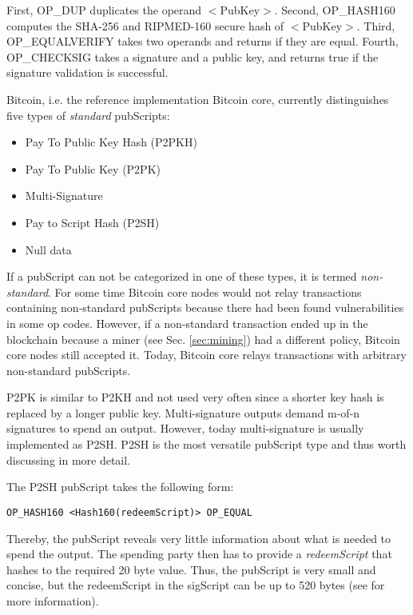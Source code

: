 First, OP\_DUP duplicates the operand $<$PubKey$>$. Second, OP\_HASH160 computes the SHA-256 and RIPMED-160 secure hash of $<$PubKey$>$. Third, OP\_EQUALVERIFY takes two operands and returns if they are equal. Fourth, OP\_CHECKSIG takes a signature and a public key, and returns true if the signature validation is successful. 

Bitcoin, i.e. the reference implementation Bitcoin core, currently distinguishes five types of \emph{standard} pubScripts:

\begin{itemize}
\item Pay To Public Key Hash (P2PKH)
\item Pay To Public Key (P2PK)
\item Multi-Signature 
\item Pay to Script Hash (P2SH)
\item Null data
\end{itemize}

If a pubScript can not be categorized in one of these types, it is termed \emph{non-standard}. For some time Bitcoin core nodes would not relay transactions containing non-standard pubScripts because there had been found vulnerabilities in some op codes. However, if a non-standard transaction ended up in the blockchain because a miner  (see Sec. \ref{sec:mining}) had a different policy, Bitcoin core nodes still accepted it. Today, Bitcoin core relays transactions with arbitrary non-standard pubScripts.

P2PK is similar to P2KH and not used very often since a shorter key hash is replaced by a longer public key. Multi-signature outputs demand m-of-n signatures to spend an output. However, today multi-signature is usually implemented as P2SH. P2SH is the most versatile pubScript type and thus worth discussing in more detail.

The P2SH pubScript takes the following form:

\begin{lstlisting}
OP_HASH160 <Hash160(redeemScript)> OP_EQUAL
\end{lstlisting}

Thereby, the pubScript reveals very little information about what is needed to spend the output. The spending party then has to provide a \emph{redeemScript} that hashes to the required 20 byte value. Thus, the pubScript is very small and concise, but the redeemScript in the sigScript can be up to 520 bytes (see \parencite{bip16} for more information). 

